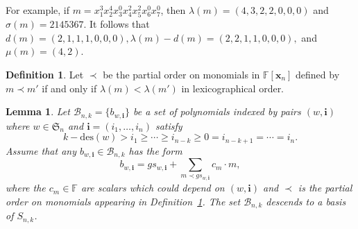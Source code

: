 \documentclass[10pt]{amsart}
\newtheorem{lemma}[theorem]{Lemma}
\theoremstyle{definition}
\newtheorem{defn}[theorem]{Definition}
\newcommand{\inv}{{\mathrm {inv}}}
\newcommand{\des}{{\mathrm {des}}}
\newcommand{\neglex}{{\mathtt {neglex}}}
\newcommand{\symm}{{\mathfrak{S}}}
\newcommand{\FF}{{\mathbb{F}}}
\newcommand{\BBB}{{\mathcal{B}}}
\newcommand{\GS}{{\mathcal{GS}}}
\newcommand{\xx}{{\mathbf {x}}}
\newcommand{\ii}{{\mathbf{i}}}
\begin{document}
For example, if $m = x_1^3 x_2^4 x_3^0 x_4^2 x_5^2 x_6^0 x_7^0$, then 
$\lambda(m) = (4,3,2,2,0,0,0)$ and $\sigma(m) = 2145367$.  It follows that 
$d(m) = (2,1,1,1,0,0,0), \lambda(m) - d(m) = (2,2,1,1,0,0,0),$ and 
$\mu(m) = (4,2)$.

\begin{defn}
\label{lex-monomial-partial-order}
Let $\prec$ be the partial order on monomials in $\FF[\xx_n]$ defined by $m \prec m'$ if and only if 
$\lambda(m) < \lambda(m')$ in lexicographical order.
\end{defn}




\begin{lemma}
\label{garsia-stanton-type-bases}
Let $\BBB_{n,k} = \{b_{w,\ii}\}$ be a set of polynomials indexed by pairs $(w, \ii)$ where $w \in \symm_n$
and $\ii = (i_1, \dots, i_n)$ satisfy 
\begin{equation*}
k - \des(w) > i_1 \geq \cdots \geq i_{n-k} \geq 0 = i_{n-k+1} = \cdots = i_n.  
\end{equation*}
Assume that any $b_{w,\ii} \in \BBB_{n,k}$
has the form
\begin{equation}
b_{w,\ii} = gs_{w,\ii} + \sum_{m \prec gs_{w,\ii}} c_m \cdot m,
\end{equation}
where the $c_m \in \FF$ are scalars which could depend on $(w,\ii)$ and $\prec$ is the partial
order on monomials appearing in Definition~\ref{lex-monomial-partial-order}. The set $\BBB_{n,k}$ descends to a basis of $S_{n,k}$.
\end{lemma}

\end{document}
